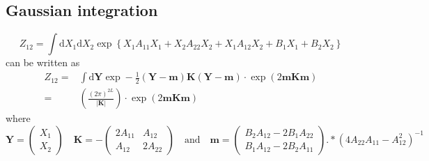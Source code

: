 \documentclass[10pt]{article}
\newcommand{\ddroit}{\textrm{d}}
\begin{document}
\subsection{Gaussian integration} %
\label{sub:gaussian_integration}
\begin{equation*}
  Z_{12} =\int\ddroit X_1 \ddroit X_2 \exp\left\{ X_1A_{11}X_1 + X_2A_{22}X_2 + X_1A_{12}X_2 + B_1X_1 + B_2X_2 \right\}
\end{equation*}
can be written as 
\begin{equation}
\begin{split}
  Z_{12}=&\int\ddroit \bm{Y} \exp-\frac{1}{2}(\bm{Y}-\bm{m})\bm{K}(\bm{Y}-\bm{m})\cdot\exp\left(2\bm{m}\bm{K}\bm{m}\right)\\
  =& \left(\frac{(2\pi)^{2L}}{\vert \bm{K}\vert}\right)\cdot\exp\left(2\bm{m}\bm{K}\bm{m}\right)
\end{split}
\end{equation}  
where 
\begin{equation*}
  \bm{Y} = \left(
  \begin{array}{c}
    X_1\\
    X_2
  \end{array}
  \right)\quad
  \bm{K} = -\left(
  \begin{array}{cc}
    2A_{11}& A_{12}\\
    A_{12}& 2A_{22}
  \end{array}
  \right)\quad\text{and}\quad
  \bm{m}=\left(
  \begin{array}{c}
    B_2A_{12} - 2B_1A_{22}\\
    B_1A_{12} - 2B_2A_{11}
  \end{array}
  \right).*(4A_{22}A_{11}-A_{12}^2)^{-1}
\end{equation*}
  





\end{document}
